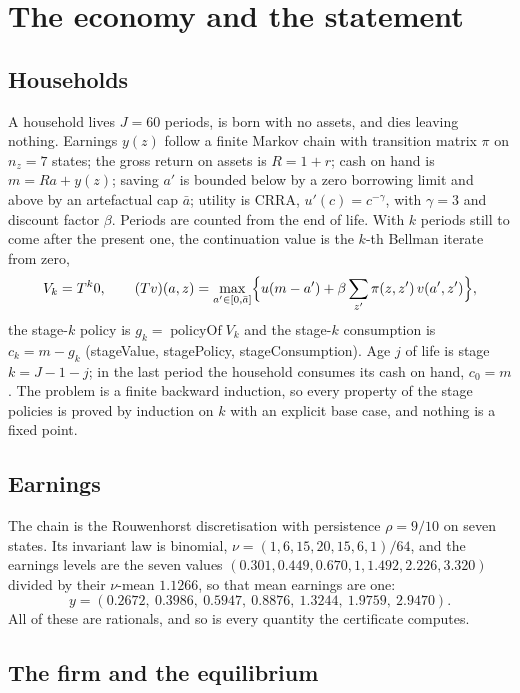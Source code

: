 \documentclass[11pt]{article}
\theoremstyle{definition}
\theoremstyle{remark}
\newcommand{\leanunderscore}{\char`\_\hskip 0pt plus 0.4pt\relax}
\newcommand{\lean}[1]{\begingroup\ttfamily\small\let\_\leanunderscore #1\endgroup}
\begin{document}
\section{The economy and the statement}\label{sec:economy}

\subsection{Households}

A household lives $J=60$ periods, is born with no assets, and dies leaving nothing. Earnings
$y(z)$ follow a finite Markov chain with transition matrix $\pi$ on $n_z=7$ states; the gross
return on assets is $R=1+r$; cash on hand is $m=Ra+y(z)$; saving $a'$ is bounded below by a zero
borrowing limit and above by an artefactual cap $\bar a$; utility is CRRA, $u'(c)=c^{-\gamma}$, with
$\gamma=3$ and discount factor $\beta$. Periods are counted from the end of life. With $k$ periods
still to come after the present one, the continuation value is the $k$-th Bellman iterate from
zero,
\[
  V_k=T^k0,\qquad (Tv)(a,z)=\max_{a'\in[0,\bar a]}\Bigl\{u(m-a')+\beta\sum_{z'}\pi(z,z')\,v(a',z')\Bigr\},
\]
the stage-$k$ policy is $g_k=\operatorname{policyOf}V_k$ and the stage-$k$ consumption is
$c_k=m-g_k$ (\lean{stageValue}, \lean{stagePolicy}, \lean{stageConsumption}). Age $j$ of life is
stage $k=J-1-j$; in the last period the household consumes its cash on hand, $c_0=m$. The problem is
a finite backward induction, so every property of the stage policies is proved by induction on $k$
with an explicit base case, and nothing is a fixed point.

\subsection{Earnings}

The chain is the Rouwenhorst discretisation with persistence $\rho=9/10$ on seven states. Its
invariant law is binomial, $\nu=(1,6,15,20,15,6,1)/64$, and the earnings levels are the seven
values $(0.301,0.449,0.670,1,1.492,2.226,3.320)$ divided by their $\nu$-mean $1.1266$, so that mean
earnings are one:
\[
  y=(0.2672,\ 0.3986,\ 0.5947,\ 0.8876,\ 1.3244,\ 1.9759,\ 2.9470).
\]
All of these are rationals, and so is every quantity the certificate computes.

\subsection{The firm and the equilibrium}
\end{document}

